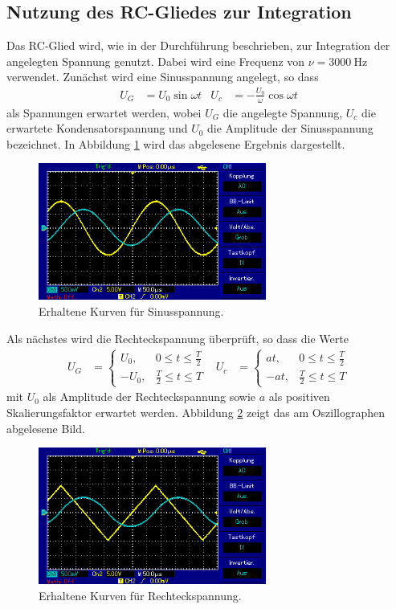 \subsection{Nutzung des RC-Gliedes zur Integration}
Das RC-Glied wird, wie in der Durchführung beschrieben, zur Integration der angelegten Spannung genutzt.
Dabei wird eine Frequenz von $\nu = \SI{3000}{\hertz}$ verwendet.
Zunächst wird eine Sinusspannung angelegt, so dass
\begin{align}
U_G &= U_0\sin{\omega t}  & U_c &= -\frac{U_0}{\omega}\cos{\omega t}
\end{align}
als Spannungen erwartet werden, wobei $U_G$ die angelegte Spannung, $U_c$ die erwartete Kondensatorspannung und $U_0$ die Amplitude der Sinusspannung bezeichnet.
In Abbildung \ref{fig:sin_r} wird das abgelesene Ergebnis dargestellt.

\begin{figure}[H]
  \centering
  \includegraphics[height=4.5cm]{oz5.png}
  \caption{Erhaltene Kurven für Sinusspannung.}
  \label{fig:sin_r}
\end{figure}


Als nächstes wird die Rechteckspannung überprüft, so dass die Werte
\begin{align}
  U_G &=
  \begin{cases}
    U_0 , &  0 \leq t \leq \frac{T}{2} \\
    -U_0 , & \frac{T}{2} \leq t \leq T
  \end{cases}
   & U_c &=
  \begin{cases}
    at , &  0 \leq t \leq \frac{T}{2} \\
    -at , & \frac{T}{2} \leq t \leq T
  \end{cases}
\end{align}
mit $U_0$ als Amplitude der Rechteckspannung sowie $a$ als positiven Skalierungsfaktor erwartet werden.
Abbildung \ref{fig:rechteck_s} zeigt das am Oszillographen abgelesene Bild.

\begin{figure}[H]
  \centering
  \includegraphics[height=4.5cm]{oz6.png}
  \caption{Erhaltene Kurven für Rechteckspannung.}
  \label{fig:rechteck_s}
\end{figure}

